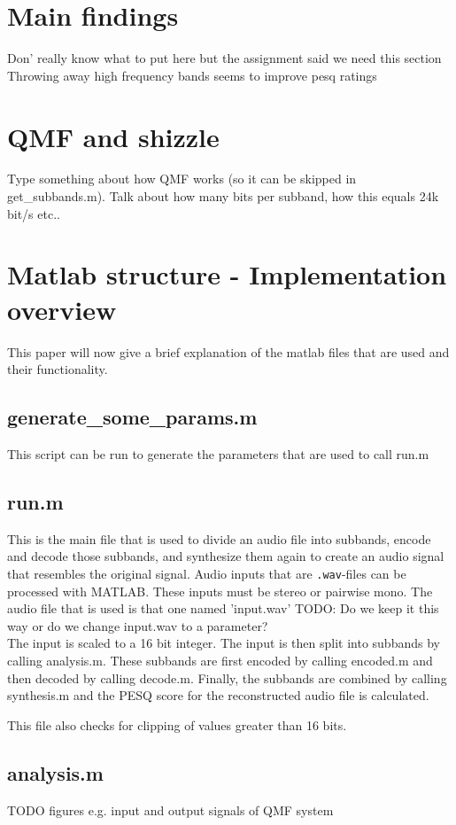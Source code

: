 \documentclass[a4paper]{article}
\begin{document}
\section{Main findings}
Don' really know what to put here but the assignment said we need this section
Throwing away high frequency bands seems to improve pesq ratings

\section{QMF and shizzle}
Type something about how QMF works (so it can be skipped in get\_subbands.m). Talk about how many bits per subband, how this equals 24k bit/s etc..

\section{Matlab structure - Implementation overview}
This paper will now give a brief explanation of the matlab files that are used and their functionality.

\subsection{generate\_some\_params.m}
This script can be run to generate the parameters that are used to call run.m

\subsection{run.m}
This is the main file that is used to divide an audio file into subbands, encode and decode those subbands, and synthesize them again to create an audio signal that resembles the original signal. Audio inputs that are \texttt{.wav}-files can be processed with MATLAB. These inputs must be stereo or pairwise mono. The audio file that is used is that one named 'input.wav' TODO: Do we keep it this way or do we change input.wav to a parameter? 
\\
The input is scaled to a 16 bit integer. The input is then split into subbands by calling analysis.m. These subbands are first encoded by calling encoded.m and then decoded by calling decode.m. Finally, the subbands are combined by calling synthesis.m and the PESQ score for the reconstructed audio file is calculated.

This file also checks for clipping of values greater than 16 bits.

\subsection{analysis.m}
TODO figures e.g. input and output signals of QMF system
\end{document}
